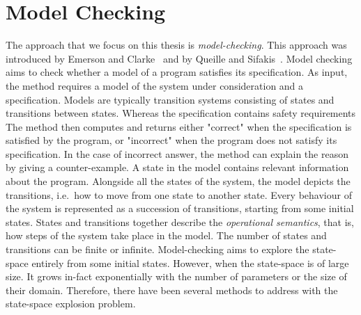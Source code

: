 \chapter{Model Checking}
\label{section:model:checking}
%
%
%

The approach that we focus on this thesis is
\emph{model-checking}.
%
%
This approach was introduced by Emerson and Clarke~\cite{CE82} and by Queille and Sifakis~\cite{QS82}. 
 Model checking aims to check whether a model of a program satisfies its specification. As input, the method requires a model of the system under
consideration and a specification. Models are typically transition systems consisting of states and transitions between states. Whereas the specification contains safety requirements 
The method then computes and returns either "correct" when the specification is satisfied by the program, or "incorrect" when the program does not satisfy its specification. In the case of incorrect answer, the method can explain the reason by giving a counter-example. A state in the model contains relevant information about the program.
Alongside all the states of the system, the model depicts the
transitions, i.e.\ how to move from one state to another state. Every behaviour of the system is represented as a succession of transitions, starting from some initial states. States and transitions together describe the \emph{operational
  semantics}, that is, how steps of the system take place in the model.
The number of states and transitions can be finite or infinite.
Model-checking aims to explore the state-space entirely from some initial states. However, when the state-space is of large size. It grows in-fact
exponentially with the number of parameters or the size of their
domain. Therefore, there have been several methods to address with the
state-space explosion problem.

